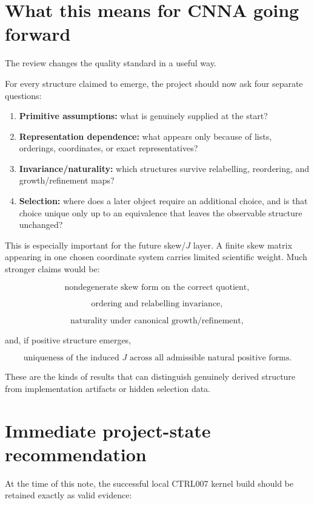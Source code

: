 \documentclass[11pt,a4paper]{article}
\begin{document}
\section{What this means for CNNA going forward}

The review changes the quality standard in a useful way.

For every structure claimed to emerge, the project should now ask four separate questions:

\begin{enumerate}
  \item \textbf{Primitive assumptions:} what is genuinely supplied at the start?
  \item \textbf{Representation dependence:} what appears only because of lists, orderings, coordinates, or exact representatives?
  \item \textbf{Invariance/naturality:} which structures survive relabelling, reordering, and growth/refinement maps?
  \item \textbf{Selection:} where does a later object require an additional choice, and is that choice unique only up to an equivalence that leaves the observable structure unchanged?
\end{enumerate}

This is especially important for the future skew/$J$ layer. A finite skew matrix appearing in one chosen coordinate system carries limited scientific weight. Much stronger claims would be:

\[
\text{nondegenerate skew form on the correct quotient},
\]

\[
\text{ordering and relabelling invariance},
\]

\[
\text{naturality under canonical growth/refinement},
\]

and, if positive structure emerges,

\[
\text{uniqueness of the induced }J\text{ across all admissible natural positive forms}.
\]

These are the kinds of results that can distinguish genuinely derived structure from implementation artifacts or hidden selection data.

\section{Immediate project-state recommendation}

At the time of this note, the successful local CTRL007 kernel build should be retained exactly as valid evidence:
\end{document}
